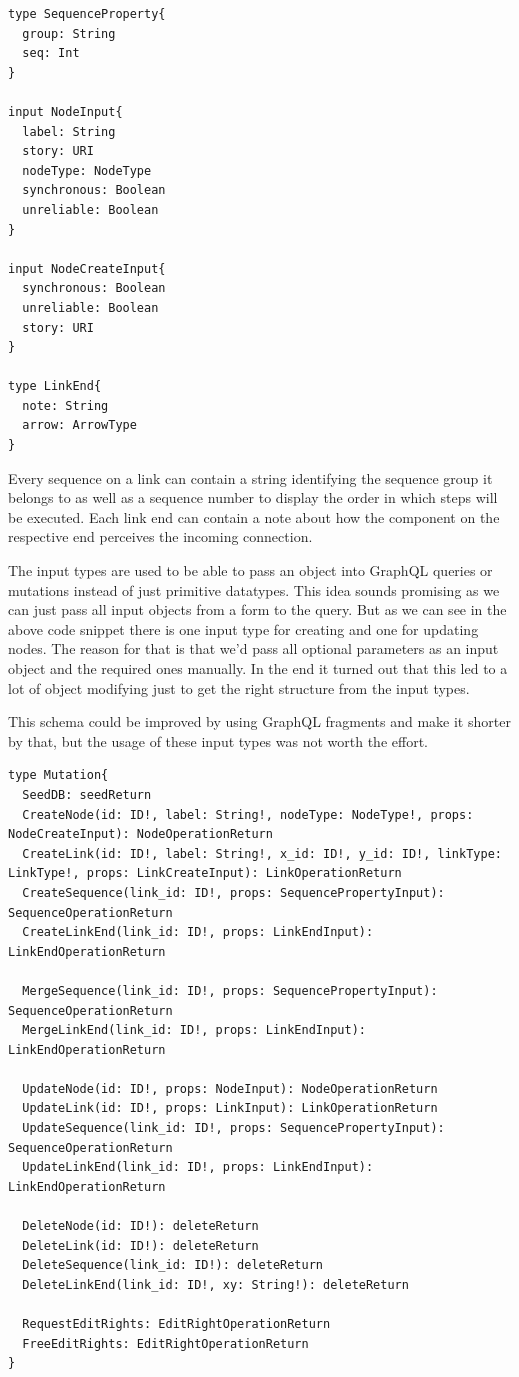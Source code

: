 \begin{lstlisting}[caption={Input Type Definitions}]
type SequenceProperty{
  group: String
  seq: Int
}

input NodeInput{
  label: String
  story: URI
  nodeType: NodeType
  synchronous: Boolean
  unreliable: Boolean
}

input NodeCreateInput{
  synchronous: Boolean
  unreliable: Boolean
  story: URI
}

type LinkEnd{
  note: String
  arrow: ArrowType
}
\end{lstlisting}
Every sequence on a link can contain a string identifying the sequence group it belongs to as well as a sequence number to display the order in which steps will be executed. Each link end can contain a note about how the component on the respective end perceives the incoming connection.

The input types are used to be able to pass an object into GraphQL queries or mutations instead of just primitive datatypes. This idea sounds promising as we can just pass all input objects from a form to the query. But as we can see in the above code snippet there is one input type for creating and one for updating nodes. The reason for that is that we'd pass all optional parameters as an input object and the required ones manually. In the end it turned out that this led to a lot of object modifying just to get the right structure from the input types.

This schema could be improved by using GraphQL fragments and make it shorter by that, but the usage of these input types was not worth the effort. 

\begin{lstlisting}[caption={Mutation Type Definition},label={mutations}]
type Mutation{
  SeedDB: seedReturn
  CreateNode(id: ID!, label: String!, nodeType: NodeType!, props: NodeCreateInput): NodeOperationReturn
  CreateLink(id: ID!, label: String!, x_id: ID!, y_id: ID!, linkType: LinkType!, props: LinkCreateInput): LinkOperationReturn
  CreateSequence(link_id: ID!, props: SequencePropertyInput): SequenceOperationReturn
  CreateLinkEnd(link_id: ID!, props: LinkEndInput): LinkEndOperationReturn

  MergeSequence(link_id: ID!, props: SequencePropertyInput): SequenceOperationReturn
  MergeLinkEnd(link_id: ID!, props: LinkEndInput): LinkEndOperationReturn

  UpdateNode(id: ID!, props: NodeInput): NodeOperationReturn
  UpdateLink(id: ID!, props: LinkInput): LinkOperationReturn
  UpdateSequence(link_id: ID!, props: SequencePropertyInput): SequenceOperationReturn
  UpdateLinkEnd(link_id: ID!, props: LinkEndInput): LinkEndOperationReturn

  DeleteNode(id: ID!): deleteReturn
  DeleteLink(id: ID!): deleteReturn
  DeleteSequence(link_id: ID!): deleteReturn
  DeleteLinkEnd(link_id: ID!, xy: String!): deleteReturn

  RequestEditRights: EditRightOperationReturn
  FreeEditRights: EditRightOperationReturn
}
\end{lstlisting}

